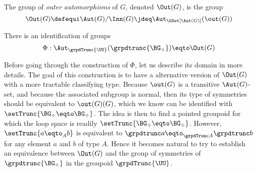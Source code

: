 \begin{definition}
  The group of {\em outer automorphisms} of $G$, denoted $\Out(G)$, is the group
  \begin{displaymath}
    \Out(G) \defequi \Aut(G)/\Inn(G) \jdeq \Aut_{\GSet[\Aut(G)]}(\out(G))
  \end{displaymath}
\end{definition}
\begin{construction}\label{cons:simpler-version-Out}
  There is an identification of groups
  \begin{displaymath}
    \Phi : \Aut_{\grpdTrunc{\UU}}(\grpdtrunc{\BG_\div}) \eqto \Out(G) 
  \end{displaymath}
\end{construction}
Before going through the construction of $\Phi$, let us describe its domain in
more details. The goal of this construction is to have a alternative version of
$\Out(G)$ with a more tractable classifying type. Because $\out(G)$ is a
transitive $\Aut(G)$-set, and because the associated subgroup is normal, then
its type of symmetries should be equivalent to $\out(G)(G)$, which we know can
be identified with $\setTrunc{\BG_\div \eqto \BG_\div}$. The idea is then to
find a pointed groupoid for which the loop space is readily
$\setTrunc{\BG_\div \eqto \BG_\div}$. However, $\setTrunc{a\eqto _Ab}$ is
equivalent to $\grpdtrunc a \eqto_{\grpdTrunc A} \grpdtrunc b$ for any element
$a$ and $b$ of type $A$. Hence it becomes natural to try to establish an
equivalence between $\Out(G)$ and the group of symmetries of
$\grpdtrunc{\BG_\div}$ in the groupoid $\grpdTrunc{\UU}$.
